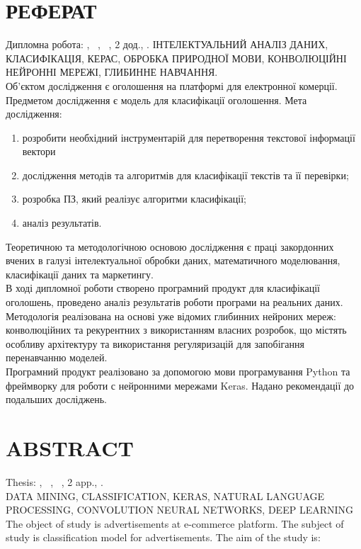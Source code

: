 \chapter*{РЕФЕРАТ}							%

Дипломна робота: , 
~,
~,
2 дод.,
.
ІНТЕЛЕКТУАЛЬНИЙ АНАЛІЗ ДАНИХ, КЛАСИФІКАЦІЯ, КЕРАС,
ОБРОБКА ПРИРОДНОЇ МОВИ, КОНВОЛЮЦІЙНІ НЕЙРОННІ МЕРЕЖІ, ГЛИБИННЕ НАВЧАННЯ.\\
Об’єктом дослідження є оголошення на платформі для електронної комерції. Предметом дослідження є модель для класифікації оголошення.
Мета дослідження:
\begin{enumerate}
	\item розробити необхідний інструментарій для перетворення текстової інформації вектори
	\item дослідження методів та алгоритмів для класифікації текстів та її перевірки;
	\item розробка ПЗ, який реалізує алгоритми класифікації;
    \item аналіз результатів.
\end{enumerate}

Теоретичною та методологічною основою дослідження є праці
закордонних вчених в галузі інтелектуальної обробки даних, математичного
моделювання, класифікації даних та маркетингу. \\
В ході дипломної роботи створено програмний продукт для класифікації оголошень, проведено аналіз результатів роботи програми на реальних даних. \\
Методологія реалізована на основі уже відомих глибинних нейроних мереж: конволюційних та рекурентних з використанням власних розробок, що містять особливу архітектуру та використання регуляризацій для запобігання перенавчанню моделей.\\
Програмний продукт реалізовано за допомогою мови програмування
Python та фреймворку для роботи с нейронними мережами Keras. Надано
рекомендації до подальших досліджень. \\


\chapter*{ABSTRACT}						


Thesis: , 
~,
~,
2 app.,
.\\
DATA MINING, CLASSIFICATION, KERAS, NATURAL LANGUAGE PROCESSING, CONVOLUTION NEURAL NETWORKS, DEEP LEARNING \\
The object of study is advertisements at e-commerce
platform. The subject of study is classification model for
advertisements.
The aim of the study is:

